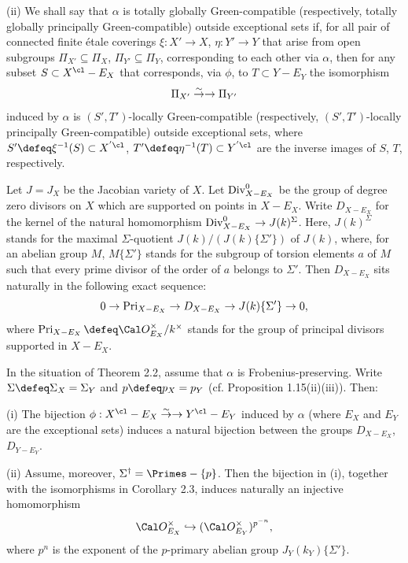 \noindent
{\rm (ii)} We shall say that $\alpha$ is totally globally 
Green-compatible (respectively, 
totally globally principally Green-compatible) 
outside exceptional sets 
if, for all pair of connected finite \'etale coverings $\xi: X'\to X$, 
$\eta: Y'\to Y$ that arise from open subgroups $\Pi_{X'}\subseteq \Pi_X$, 
$\Pi _{Y'}\subseteq \Pi_Y$, 
corresponding to each other via $\alpha$, then for any subset $S\subset X^{\cl}-E_X$ 
that corresponds, via $\phi$, to $T\subset Y-E_Y$ the isomorphism
$$\Pi_{X'}\overset \sim \to \rightarrow \Pi_{Y'}$$
induced by $\alpha$ is $(S',T')$-locally Green-compatible (respectively, 
$(S',T')$-locally principally Green-compatible) 
outside exceptional sets, 
where $S'\defeq\xi ^{-1}(S)\subset X^{'\cl}$, 
$T'\defeq\eta^{-1} (T)  \subset Y^{'\cl}$ 
are the inverse images of $S$, $T$, respectively.
\enddefinition

Let $J=J_X$ be the Jacobian variety of $X$. 
Let $\operatorname {Div} _{X- E_X}^0$ be the group of degree zero divisors 
on $X$ which are supported on points in $X-E_X$. 
Write $D_{X- E_X}$ for the kernel of the natural homomorphism 
$\operatorname {Div} _{X- E_X}^0\to J(k)^{\Sigma}$. 
Here, $J(k)^{\Sigma}$ stands for the maximal $\Sigma$-quotient 
$J(k)/(J(k)\{\Sigma'\})$ of $J(k)$, where, 
for an abelian group $M$, $M\{\Sigma'\}$ stands 
for the subgroup of torsion elements $a$ of $M$ such 
that every prime divisor of the order of $a$ 
belongs to $\Sigma'$. 
Then $D_{X- E_X}$ sits naturally in the following exact sequence:
$$0\to \operatorname {Pri}  _{X- E_X}\to D_{X- E_X}\to J(k)\{\Sigma'\} \to 0,$$
where $\Pri _{X- E_X}\defeq \Cal O_{E_X}^{\times}/k^{\times}$ 
stands for the group of principal divisors supported in $X-E_X $.
\enddefinition



 In the situation of 
Theorem 2.2, assume that $\alpha$ is Frobenius-preserving. 
Write $\Sigma\defeq\Sigma_X=\Sigma_Y$ and 
$p\defeq p_X=p_Y$ (cf. Proposition 1.15(ii)(iii)). 
Then:

\noindent
{\rm (i)} The bijection $\phi:X^{\cl}-E_X\isom Y^{\cl}-E_Y$
induced by $\alpha$ (where $E_X$ and $E_Y$ are the exceptional sets) 
induces a natural bijection between the groups 
$D_{X- E_X}$, $D_{Y- E_Y}$. %

\noindent
{\rm (ii)} Assume, moreover, $\Sigma ^{\dag}=\Primes-\{p\}$. 
Then the bijection in (i), together with the isomorphisms 
in Corollary 2.3, induces naturally an injective homomorphism
$$\Cal O_{E_X}^{\times} \hookrightarrow (\Cal O_{E_Y}^{\times})^{p^{-n}},$$
where $p^n$ is the exponent %
of the $p$-primary abelian group $J_Y(k_Y)\{\Sigma'\}$. 

